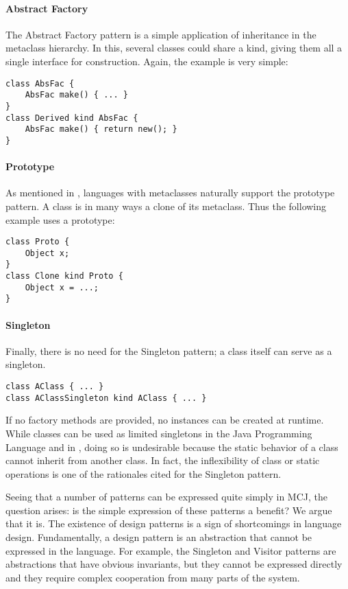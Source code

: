 \documentclass[10pt]{acm-sigplan}
\begin{document}
\paragraph{Abstract Factory}
 The Abstract Factory pattern is a simple application of
inheritance in the metaclass hierarchy.  In this, several classes
could share a kind, giving them all a single interface for
construction. Again, the example is very simple:
\begin{verbatim}
class AbsFac {
    AbsFac make() { ... }
}
class Derived kind AbsFac {
    AbsFac make() { return new(); }
}
\end{verbatim}

\newpage
\paragraph{Prototype}
As mentioned in \cite{GOF}, languages with metaclasses naturally
support the prototype pattern.  A class is in many ways a clone of its
metaclass.  Thus the following example uses a prototype:

\begin{verbatim}
class Proto {
    Object x;
}
class Clone kind Proto {
    Object x = ...;
}
\end{verbatim}

\paragraph{Singleton}
Finally, there is no need for the Singleton pattern; a
class itself can serve as a singleton. 
\begin{verbatim}
class AClass { ... }
class AClassSingleton kind AClass { ... }
\end{verbatim}
If no factory methods are
provided, no instances can be created at runtime.  While classes can
be used as limited singletons in the Java Programming Language and in
\Cpp, doing so is undesirable because the static behavior of a class
cannot inherit from another class.  In fact, the inflexibility of
class or static operations is one of the rationales cited for the
Singleton pattern.

Seeing that a number of patterns can be expressed quite simply in MCJ,
the question arises: is the simple expression of these patterns a
benefit?  We argue that it is.  The existence of design patterns is a
sign of shortcomings in language design.  Fundamentally, a design
pattern is an abstraction that cannot be expressed in the language.
For example, the Singleton and Visitor patterns are abstractions that
have obvious invariants, but they cannot be expressed directly and
they require complex cooperation from many parts of the system.
\end{document}

